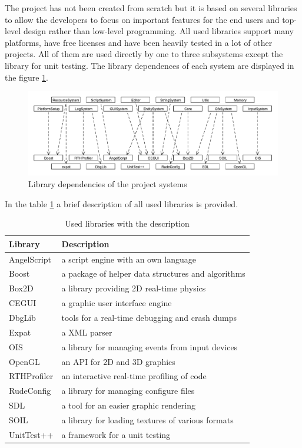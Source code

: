 \documentclass[a4paper, 12pt]{report}
\begin{document}
The project has not been created from scratch but it is based on several libraries to allow the developers to focus on important features for the end users and top-level design rather than low-level programming. All used libraries support many platforms, have free licenses and have been heavily tested in a lot of other projects. All of them are used directly by one to three subsystems except the library for unit testing. The library dependences of each system are displayed in the figure \ref{fig:library-dependence}.

\begin{figure}[htbp]
	\centering
		\includegraphics[width=1\textwidth]{LibraryDependence.pdf}
	\caption{Library dependencies of the project systems}
	\label{fig:library-dependence}
\end{figure}

In the table \ref{tab:library-list} a brief description of all used libraries is provided.

\begin{table}[htbp]
	\centering
		\begin{tabular}{|p{0.23\hsize}|p{0.70\hsize}|}
			\hline
			Library & Description\\
			\hline
			AngelScript\cite{angelscript} & a script engine with an own language\\
			Boost\cite{boost} & a package of helper data structures and algorithms\\
			Box2D\cite{box2d} & a library providing 2D real-time physics\\
			CEGUI\cite{cegui} & a graphic user interface engine\\
			DbgLib\cite{dbglib} & tools for a real-time debugging and crash dumps\\
			Expat\cite{expat} & a XML parser\\
			OIS\cite{ois} & a library for managing events from input devices\\
			OpenGL\cite{opengl} & an API for 2D and 3D graphics\\
			RTHProfiler\cite{rthprofiler} & an interactive real-time profiling of code\\
			RudeConfig\cite{rudeconfig} & a library for managing configure files\\
			SDL\cite{sdl} & a tool for an easier graphic rendering\\
			SOIL\cite{soil} & a library for loading textures of various formats\\
			UnitTest++\cite{unittest} & a framework for a unit testing\\
			\hline
		\end{tabular}
	\caption[Used libraries with the description]{Used libraries with the description}
	\label{tab:library-list}
\end{table}
\end{document}
